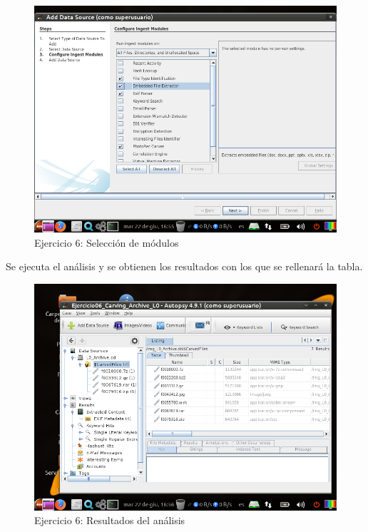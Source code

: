\documentclass[11pt]{article}
\begin{document}
\begin{figure}[H]
    \caption{Ejercicio 6: Selección de módulos}
    \centering
    \includegraphics[scale=0.7]{e6-4.png}
\end{figure}

Se ejecuta el análisis y se obtienen los resultados con los que se rellenará la tabla.

\begin{figure}[H]
    \caption{Ejercicio 6: Resultados del análisis}
    \centering
    \includegraphics[scale=0.7]{e6-5.png}
\end{figure}
\end{document}
